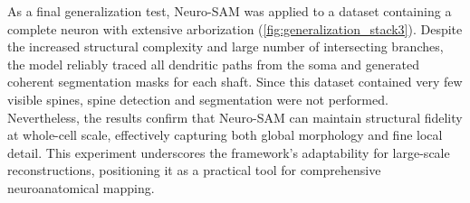 As a final generalization test, Neuro-\gls{SAM} was applied to a dataset containing a complete neuron with extensive arborization (\autoref{fig:generalization_stack3}). Despite the increased structural complexity and large number of intersecting branches, the model reliably traced all dendritic paths from the soma and generated coherent segmentation masks for each shaft. Since this dataset contained very few visible spines, spine detection and segmentation were not performed. Nevertheless, the results confirm that Neuro-\gls{SAM} can maintain structural fidelity at whole-cell scale, effectively capturing both global morphology and fine local detail. This experiment underscores the framework’s adaptability for large-scale reconstructions, positioning it as a practical tool for comprehensive neuroanatomical mapping.

